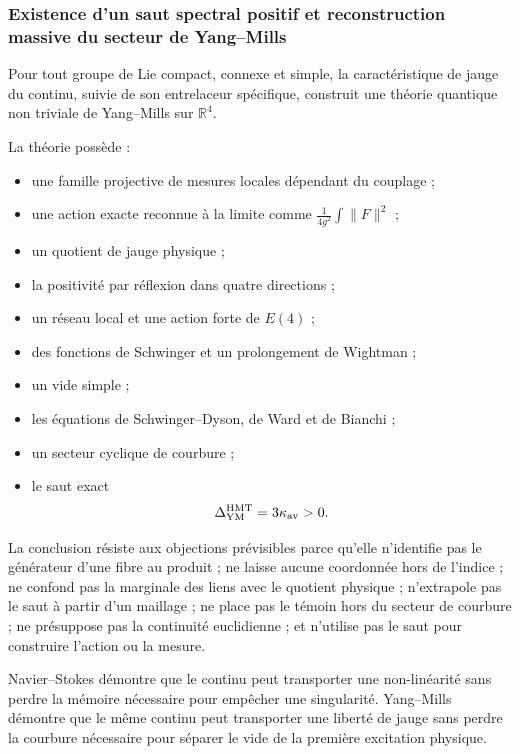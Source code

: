 \subsubsection{Existence d’un saut spectral positif et reconstruction massive du secteur de Yang–Mills}
Pour tout groupe de Lie compact, connexe et simple, la caractéristique de jauge du continu, suivie de son entrelaceur spécifique, construit une théorie quantique non triviale de Yang--Mills sur \(\mathbb R^4\).\par
La théorie possède :\par
\begin{itemize}
\item une famille projective de mesures locales dépendant du couplage ;
\item une action exacte reconnue à la limite comme \(\frac1{4g^2}\int\|F\|^2\) ;
\item un quotient de jauge physique ;
\item la positivité par réflexion dans quatre directions ;
\item un réseau local et une action forte de \(E(4)\) ;
\item des fonctions de Schwinger et un prolongement de Wightman ;
\item un vide simple ;
\item les équations de Schwinger–Dyson, de Ward et de Bianchi ;
\item un secteur cyclique de courbure ;
\item le saut exact
  \[
  \Delta_{\rm YM}^{\rm HMT}=3\kappa_{\rm av}>0.
  \]
\end{itemize}
La conclusion résiste aux objections prévisibles parce qu’elle n’identifie pas le générateur d’une fibre au produit ; ne laisse aucune coordonnée hors de l’indice ; ne confond pas la marginale des liens avec le quotient physique ; n’extrapole pas le saut à partir d’un maillage ; ne place pas le témoin hors du secteur de courbure ; ne présuppose pas la continuité euclidienne ; et n’utilise pas le saut pour construire l’action ou la mesure.\par
Navier–Stokes démontre que le continu peut transporter une non-linéarité sans perdre la mémoire nécessaire pour empêcher une singularité. Yang–Mills démontre que le même continu peut transporter une liberté de jauge sans perdre la courbure nécessaire pour séparer le vide de la première excitation physique.\par

